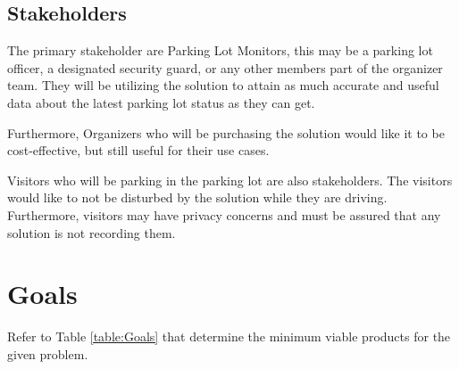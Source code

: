 \documentclass{article}
\begin{document}
\subsection{Stakeholders}
The primary stakeholder are Parking Lot Monitors, this may be a parking lot officer, a designated security guard, or any other members part of the organizer team. They will be utilizing the solution to attain as much accurate and useful data about the latest parking lot status as they can get.

Furthermore, Organizers who will be purchasing the solution would like it to be cost-effective, but still useful for their use cases.

Visitors who will be parking in the parking lot are also stakeholders. The visitors would like to not be disturbed by the solution while they are driving. Furthermore, visitors may have privacy concerns and must be assured that any solution is not recording them.

\section{Goals}

Refer to Table \ref{table:Goals} that determine the minimum viable products for the given problem.
\end{document}
